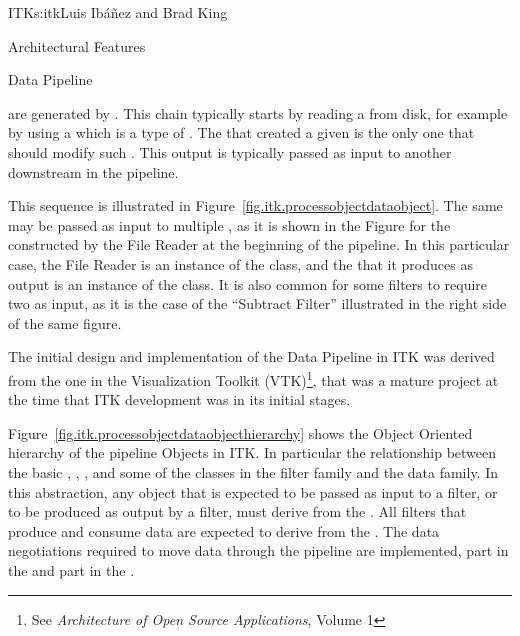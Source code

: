 \begin{aosachapter}{ITK}{s:itk}{Luis Ib\'{a}\~{n}ez and Brad King}
\begin{aosasect1}{Architectural Features}
\begin{aosasect2}{Data Pipeline}

 are generated by . This chain typically starts by
reading a  from disk, for example by using a  which is
a type of . The  that created a given  is
the only one that should modify such . This output  is
typically passed as input to another  downstream in the pipeline.

This sequence is illustrated in Figure~\ref{fig.itk.processobjectdataobject}.
The same  may be passed as input to multiple
, as it is shown in the Figure for the 
constructed by the File Reader at the beginning of the pipeline.
In this particular case, the File Reader is an instance of the
 class, and the  that it produces as
output is an instance of the  class.
It is also common for some filters to require two  as input,
as it is the case of the ``Subtract Filter'' illustrated in the right side of
the same figure.

The initial design and implementation of the Data Pipeline in ITK was derived
from the one in the Visualization Toolkit (VTK)\footnote{See \emph{Architecture
of Open Source Applications}, Volume 1}, that was a mature project at the time
that ITK development was in its initial stages.

Figure~\ref{fig.itk.processobjectdataobjecthierarchy} shows the Object Oriented
hierarchy of the pipeline Objects in ITK. In particular the relationship
between the basic , , , and
some of the classes in the filter family and the data family. In this
abstraction, any object that is expected to be passed as input to a filter, or
to be produced as output by a filter, must derive from the . All
filters that produce and consume data are expected to derive from the
. The data negotiations required to move data through the
pipeline are implemented, part in the  and part in the
.



\end{aosasect2}
\end{aosasect1}
\end{aosachapter}
